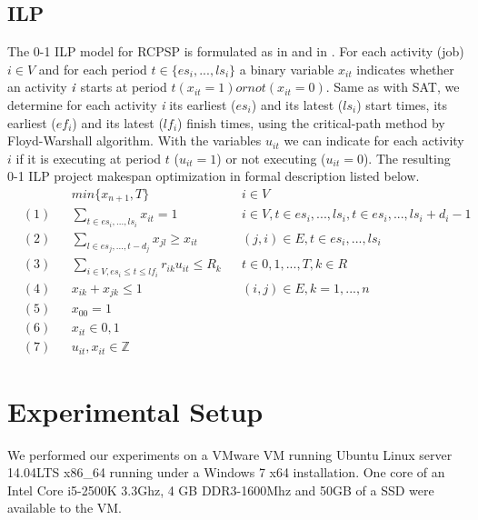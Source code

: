 \documentclass{sig-alternate}
\begin{document}
\subsection{ILP}
The 0-1 ILP model for RCPSP is formulated as in \cite{horbach2010boolean} and in \cite{mingozzi1998exact}.
For each activity (job) $i \in V$ and for each period $t \in \{es_i,...,ls_i\}$ a binary variable $x_{it}$ indicates whether an activity $\emph{i}$ starts at period $t (x_{it} = 1) or not (x_{it} = 0)$.
Same as with SAT, we determine for each activity \emph{i} its earliest ($es_i$) and its latest ($ls_i$) start times, its earliest ($ef_i$) and its latest ($lf_i$) finish times, using the critical-path method by Floyd-Warshall algorithm.
With the variables $u_{it}$ we can indicate for each activity $i$ if it is executing at period $t$ ($u_{it} = 1$) or not executing ($u_{it} = 0$).
The resulting 0-1 ILP project makespan optimization in formal description listed below.
\begin{subequations}
\begin{align*}
        & & & min\{x_{n+1},T\} & & {i} \in {V} \\
        &  (1) & & \sum\limits_{{t}\in{es_i,...,ls_i}} {x_{it}} = 1 & & {i} \in {V}, {t} \in {es_i,...,ls_i}, {t} \in {es_i,...,ls_i} + {d_i} - 1 \\
        &  (2) & & \sum\limits_{{l}\in{es_j,...,t-d_j}} {x_{jl}} \geq {x_{it}} & & {(j,i)} \in {E}, {t} \in {es_i,...,ls_i} \\
        &  (3) & & \sum\limits_{{i}\in{V,}{es_i}\leq{t}\leq{lf_i}} {r_{ik}}{u_{it}} \leq {R_k} & & {t} \in {0,1,...,{T}}, {k} \in {R} \\
        &  (4) & & {x_{ik}} + {x_{jk}} \leq 1 & & (i,j) \in E, {k} = 1,...,{n} \\
        &  (5) & & {x_{00}} = 1 & & \\
        &  (6) & & {x_{it}} \in {0, 1} & & \\
        &  (7) & & {u_{it}}, {x_{it}} \in \mathbb{Z} & &
\end{align*}
\end{subequations}

\section{Experimental Setup}

We performed our experiments on a VMware VM running Ubuntu Linux server 14.04LTS x86\_64  running under a Windows 7 x64 installation.
One core of an Intel Core i5-2500K 3.3Ghz, 4 GB DDR3-1600Mhz and 50GB of a SSD were available to the VM.
\end{document}
